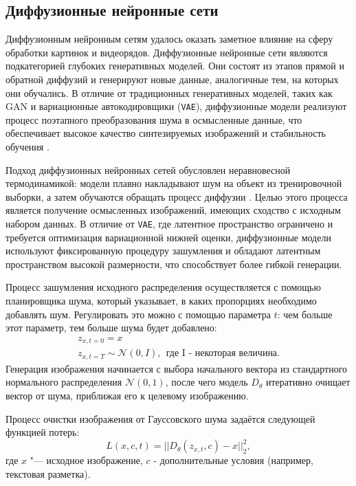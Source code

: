 \subsection{Диффузионные нейронные сети}
Диффузионным нейронным сетям удалось оказать заметное влияние на сферу обработки картинок и видеорядов. Диффузионные нейронные сети являются подкатегорией глубоких генеративных моделей. Они состоят из этапов прямой и обратной диффузий и генерируют новые данные, аналогичные тем, на которых они обучались. В отличие от традиционных генеративных моделей, таких как GAN и вариационные автокодировщики (\texttt{VAE}), диффузионные модели реализуют процесс поэтапного преобразования шума в осмысленные данные, что обеспечивает высокое качество синтезируемых изображений и стабильность обучения \cite{diffusion_intro}.

Подход диффузионных нейронных сетей обусловлен неравновесной термодинамикой: модели плавно накладывают шум на объект из тренировочной выборки, а затем обучаются обращать процесс диффузии \cite{diffusion_thermo}. Целью этого процесса является получение осмысленных изображений, имеющих сходство с исходным набором данных. В отличие от \texttt{VAE}, где латентное пространство ограничено и требуется оптимизация вариационной нижней оценки, диффузионные модели используют фиксированную процедуру зашумления и обладают латентным пространством высокой размерности, что способствует более гибкой генерации.

Процесс зашумления исходного распределения осуществляется с помощью планировщика шума, который указывает, в каких пропорциях необходимо добавлять шум. Регулировать это можно с помощью параметра $t$: чем больше этот параметр, тем больше шума будет добавлено:
\begin{gather}
z_{x, t = 0} = x\\ \label{math:dnn1}
z_{x, t = T} \sim \mathcal{N}(0, I), ~~ \text{где I - некоторая величина.}
\end{gather}
Генерация изображения начинается с выбора начального вектора из стандартного нормального распределения $\mathcal{N}(0, 1)$, после чего модель $D_{\theta}$ итеративно очищает вектор от шума, приближая его к целевому изображению.

Процесс очистки изображения от Гауссовского шума задаётся следующей функцией потерь:
\begin{equation}
    L(x, c, t) = ||D_{\theta}(z_{x, t}, c) - x||_2^2,
\end{equation}
где $x$ "--- исходное изображение, $c$ - дополнительные условия (например, текстовая разметка).

